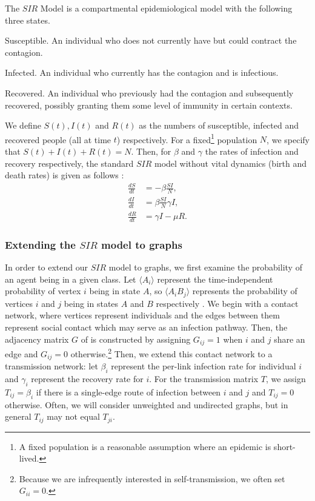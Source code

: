\documentclass[../report.tex]{subfiles}
\begin{document}
The $SIR$ Model is a compartmental epidemiological model with the following three states.
\begin{definition}{Susceptible.}
An individual who does not currently have but could contract the contagion.
\end{definition}
\begin{definition}{Infected.}
An individual who currently has the contagion and is infectious.
\end{definition}
\begin{definition}{Recovered.}
An individual who previously had the contagion and subsequently recovered, possibly granting them some level of immunity in certain contexts.
\end{definition}
We define $S(t), I(t)$ and $R(t)$ as the numbers of susceptible, infected and recovered people (all at time $t$) respectively. For a fixed\footnote{A fixed population is a reasonable assumption where an epidemic is short-lived.} population $N$, we specify that $S(t) + I(t) + R(t) = N$. Then, for $\beta$ and $\gamma$ the rates of infection and recovery respectively, the standard $SIR$ model without vital dynamics (birth and death rates) is given as follows \cite{hethcote_00}:
\begin{align*}
\frac{dS}{dt} & = -\beta \frac{SI}{N},\\
\frac{dI}{dt} & = \beta\frac{SI}{N} \gamma I,\\
\frac{dR}{dt} & = \gamma I - \mu R.
\end{align*}

\subsubsection{Extending the $SIR$ model to graphs}

In order to extend our $SIR$ model to graphs, we first examine the probability of an agent being in a given class. Let $\langle A_i \rangle$ represent the time-independent probability of vertex $i$ being in state $A$, so $\langle A_i B_j \rangle$ represents the probability of vertices $i$ and $j$ being in states $A$ and $B$ respectively \cite{kiss_2014}. We begin with a contact network, where vertices represent individuals and the edges between them represent social contact which may serve as an infection pathway. Then, the adjacency matrix $G$ of is constructed by assigning $G_{ij} = 1$ when $i$ and $j$ share an edge and $G_{ij} = 0$ otherwise.\footnote{Because we are infrequently interested in self-transmission, we often set $G_{ii}=0.$} Then, we extend this contact network to a transmission network: let $\beta_i$ represent the per-link infection rate for individual $i$ and $\gamma_i$ represent the recovery rate for $i$. For the transmission matrix $T$, we assign $T_{ij}=\beta_i$ if there is a single-edge route of infection between $i$ and $j$ and $T_{ij}=0$ otherwise. Often, we will consider unweighted and undirected graphs, but in general $T_{ij}$ may not equal $T_{ji}$.
\end{document}
